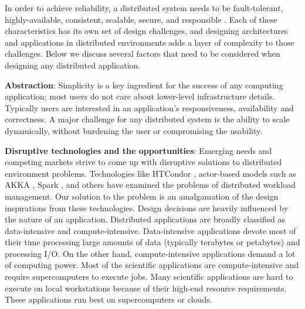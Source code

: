 \documentclass[review]{elsarticle}
\begin{document}
In order to achieve reliability, a distributed system needs to be fault-tolerant, highly-available, consistent, scalable, secure, and responsible \cite{burns2016design, casavant1988taxonomy}. Each of these characteristics has its own set of design challenges, and designing architectures and applications in distributed environments adds a layer of complexity to those challenges.  Below we discuss several factors that need to be considered when designing any distributed application.

\textbf{Abstraction}: Simplicity is a key ingredient for the success of any computing application; most users do not care about lower-level infrastructure details. Typically users are interested in an application's responsiveness, availability and correctness. A major challenge for any distributed system is the ability to scale dynamically, without burdening the user or compromising the usability. 

\textbf{Disruptive technologies and the opportunities}: Emerging needs and competing markets strive to come up with disruptive solutions to distributed environment problems. Technologies like HTCondor \cite{tannenbaum2001condor,thain2005distributed}, actor-based models such as AKKA \cite{akka}, Spark \cite{zaharia2010spark}, and others have examined the problems of distributed workload management. Our solution to the problem is an amalgamation of the design inspirations from these technologies. Design decisions are heavily influenced by the nature of an application. Distributed applications are broadly classified as data-intensive and compute-intensive. Data-intensive applications devote most of their time processing large amounts of data (typically terabytes or petabytes) and processing I/O. On the other hand, compute-intensive applications demand a lot of computing power. Most of the scientific applications are compute-intensive and require supercomputers to execute jobs. Many scientific applications are hard to execute on local workstations because of their high-end resource requirements. These applications run best on supercomputers or clouds.
\end{document}
